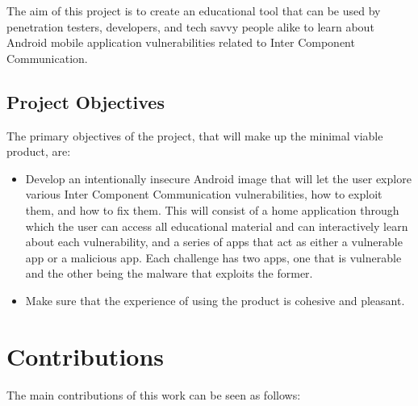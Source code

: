         The aim of this project is to create an educational tool that can be used by penetration testers, developers, and tech savvy people alike to learn about Android mobile application vulnerabilities related to Inter Component Communication.
        
        \subsection{Project Objectives}
        
        The primary objectives of the project, that will make up the minimal viable product, are:
        
        \begin{itemize}
            \item Develop an intentionally insecure Android image that will let the user explore various Inter Component Communication vulnerabilities, how to exploit them, and how to fix them. This will consist of a home application through which the user can access all educational material and can interactively learn about each vulnerability, and a series of apps that act as either a vulnerable app or a malicious app. Each challenge has two apps, one that is vulnerable and the other being the malware that exploits the former.
            \item Make sure that the experience of using the product is cohesive and pleasant.
        \end{itemize}
	
	\section{Contributions} 
		\label{sec:intro_contribs} 
		
		The main contributions of this work can be seen as follows:
		
